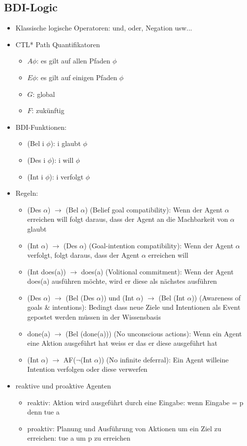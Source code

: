 \documentclass{article} %
\begin{document}
	\subsection{BDI-Logic}
	\begin{itemize}
		\item Klassische logische Operatoren: und, oder, Negation usw...
		\item CTL* Path Quantifikatoren
		\begin{itemize}
			\item $A \phi$: es gilt auf allen Pfaden $\phi$
			\item $E \phi$: es gilt auf einigen Pfaden $\phi$
			\item $G$: global
			\item $F$: zukünftig
		\end{itemize}
		\item BDI-Funktionen:
		\begin{itemize}
			\item (Bel i $\phi$): i glaubt $\phi$
			\item (Des i $\phi$): i will $\phi$
			\item (Int i $\phi$): i verfolgt $\phi$
		\end{itemize}
		\item Regeln:
		\begin{itemize}
			\item (Des $\alpha$) $\rightarrow$ (Bel $\alpha$) (Belief goal compatibility): Wenn der Agent $\alpha$ erreichen will folgt daraus, dass der Agent an die Machbarkeit von $\alpha$ glaubt
			\item (Int $\alpha$) $\rightarrow$ (Des $\alpha$) (Goal-intention compatibility): Wenn der Agent $\alpha$ verfolgt, folgt daraus, dass der Agent $\alpha$ erreichen will
			\item (Int does(a)) $\rightarrow$ does(a) (Volitional commitment): Wenn der Agent does(a) ausführen möchte, wird er diese als nächstes ausführen
			\item (Des $\alpha$) $\rightarrow$ (Bel (Des $\alpha$)) und (Int $\alpha$) $\rightarrow$ (Bel (Int $\alpha$)) (Awareness of goals \& intentions): Bedingt dass neue Ziele und Intentionen als Event gepostet werden müssen in der Wissensbasis
			\item done(a) $\rightarrow$ (Bel (done(a))) (No unconscious actions): Wenn ein Agent eine Aktion ausgeführt hat weiss er das er diese ausgeführt hat
			\item (Int $\alpha$) $\rightarrow$ AF($\neg$(Int $\alpha$)) (No infinite deferral): Ein Agent willeine Intention verfolgen oder diese verwerfen
		\end{itemize}
		\item reaktive und proaktive Agenten
		\begin{itemize}
			\item reaktiv: Aktion wird ausgeführt durch eine Eingabe: wenn Eingabe = p denn tue a
			\item proaktiv: Planung und Ausführung von Aktionen um ein Ziel zu erreichen: tue a um p zu erreichen
		\end{itemize}
	\end{itemize}
	
\end{document}
